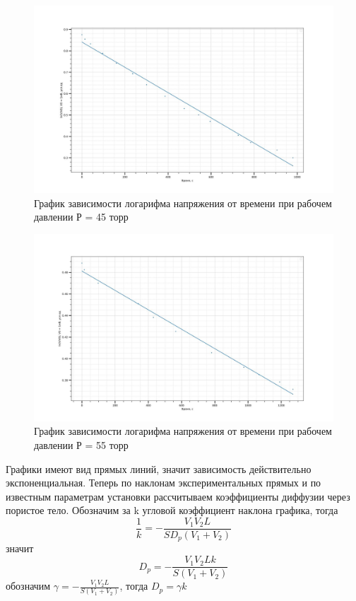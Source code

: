 \documentclass[a4paper,12pt]{article}
\begin{document}
\begin{figure}[H]
  \begin{center}
    \includegraphics[width=16cm]{graphik45.jpg}
    \caption{График зависимости логарифма напряжения от времени при рабочем давлении Р = 45 торр}
    \label{fig:}
  \end{center}
\end{figure}

\begin{figure}[H]
  \begin{center}
    \includegraphics[width=16cm]{graphik55.jpg}
    \caption{График зависимости логарифма напряжения от времени при рабочем давлении Р = 55 торр}
    \label{fig:}
  \end{center}
\end{figure}

Графики имеют вид прямых линий, значит зависимость действительно экспоненциальная. Теперь по наклонам экспериментальных прямых и по известным параметрам установки рассчитываем коэффициенты диффузии через пористое тело. Обозначим за k угловой коэффициент наклона графика, тогда
\[ \frac{1}{k} = -\frac{V_1 V_2 L}{S D_p (V_1 + V_2)} \]
значит 
\[D_p = -\frac{V_1 V_2 L k}{S  (V_1 + V_2)}  \]
обозначим $\gamma = -\frac{V_1 V_2 L}{S (V_1 + V_2)} $, тогда $D_p = \gamma k$
\end{document}
